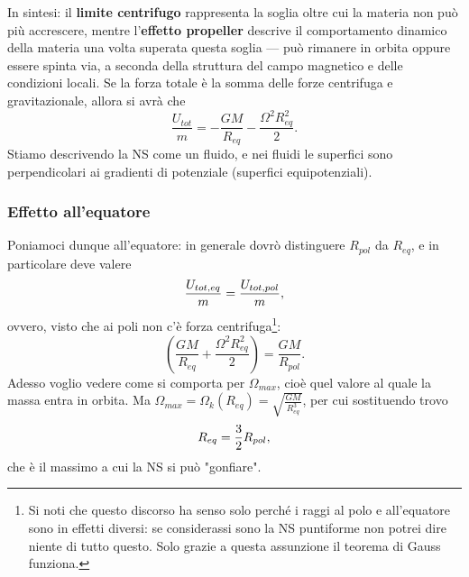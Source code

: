 In sintesi: il \textbf{limite centrifugo} rappresenta la soglia oltre cui la materia non può più accrescere, mentre l’\textbf{effetto propeller} descrive il comportamento dinamico della materia una volta superata questa soglia — può rimanere in orbita oppure essere spinta via, a seconda della struttura del campo magnetico e delle condizioni locali.
Se la forza totale è la somma delle forze centrifuga e gravitazionale, allora si avrà che 
\begin{equation}
    \frac{U_{tot}}{m} = -\frac{GM}{R_{eq}} - \frac{\Omega^2R_{eq}^2}{2}.
\end{equation}
Stiamo descrivendo la NS come un fluido, e nei fluidi le superfici sono perpendicolari ai gradienti di potenziale (superfici equipotenziali).
\vspace{2mm}
\subsubsection{Effetto all'equatore}
Poniamoci dunque all'equatore: in generale dovrò distinguere $R_{pol}$ da $R_{eq} $, e in particolare deve valere
\begin{equation}
    \frac{U_{tot,eq}}{m} = \frac{U_{tot,pol}}{m}\notag,
\end{equation}
ovvero, visto che ai poli non c'è forza centrifuga\footnote{Si noti che questo discorso ha senso solo perché i raggi al polo e all'equatore sono in effetti diversi: se considerassi sono la NS puntiforme non potrei dire niente di tutto questo. 
Solo grazie a questa assunzione il teorema di Gauss funziona.}:
\begin{equation}
    \left( \frac{GM}{R_{eq}} + \frac{\Omega^2R_{eq}^2}{2} \right) =  \frac{GM}{R_{pol}}.
\end{equation}
Adesso voglio vedere come si comporta per $\Omega_{max}$, cioè quel valore al quale la massa entra in orbita. 
Ma $\Omega_{max} = \Omega_k(R_{eq}) = \sqrt{\frac{GM}{R_{eq}^3}} $, per cui sostituendo trovo
\begin{equation}
    R_{eq} = \frac{3}{2}R_{pol}, \notag
    \label{eq: relazione raggi modello Roche}
\end{equation}
che è il massimo a cui la NS si può "gonfiare".

